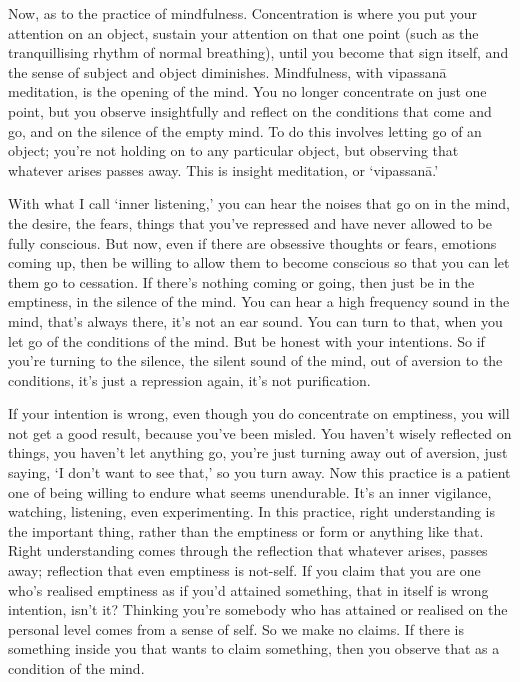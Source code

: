 
Now, as to the practice of mindfulness. Concentration is where you put your attention on an object, sustain your attention on that one point (such as the tranquillising rhythm of normal breathing), until you become that sign itself, and the sense of subject and object diminishes. Mindfulness, with vipassanā meditation, is the opening of the mind. You no longer concentrate on just one point, but you observe insightfully and reflect on the conditions that come and go, and on the silence of the empty mind. To do this involves letting go of an object; you're not holding on to any particular object, but observing that whatever arises passes away. This is insight meditation, or `vipassanā.'

With what I call `inner listening,' you can hear the noises that go on in the mind, the desire, the fears, things that you've repressed and have never allowed to be fully conscious. But now, even if there are obsessive thoughts or fears, emotions coming up, then be willing to allow them to become conscious so that you can let them go to cessation. If there's nothing coming or going, then just be in the emptiness, in the silence of the mind. You can hear a high frequency sound in the mind, that's always there, it's not an ear sound. You can turn to that, when you let go of the conditions of the mind. But be honest with your intentions. So if you're turning to the silence, the silent sound of the mind, out of aversion to the conditions, it's just a repression again, it's not purification.

If your intention is wrong, even though you do concentrate on emptiness, you will not get a good result, because you've been misled. You haven't wisely reflected on things, you haven't let anything go, you're just turning away out of aversion, just saying, `I don't want to see that,' so you turn away. Now this practice is a patient one of being willing to endure what seems unendurable. It's an inner vigilance, watching, listening, even experimenting. In this practice, right understanding is the important thing, rather than the emptiness or form or anything like that. Right understanding comes through the reflection that whatever arises, passes away; reflection that even emptiness is not-self. If you claim that you are one who's realised emptiness as if you'd attained something, that in itself is wrong intention, isn't it? Thinking you're somebody who has attained or realised on the personal level comes from a sense of self. So we make no claims. If there is something inside you that wants to claim something, then you observe that as a condition of the mind.

